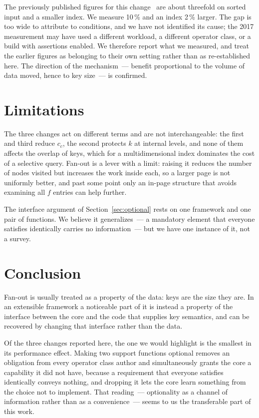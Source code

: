 The previously published figures for this change~\cite{borodin2017memory} are
about threefold on sorted input and a smaller index. We measure 10\,\% and an
index 2\,\% larger. The gap is too wide to attribute to conditions, and we have
not identified its cause; the 2017 measurement may have used a different
workload, a different operator class, or a build with assertions enabled. We
therefore report what we measured, and treat the earlier figures as belonging to
their own setting rather than as re-established here. The direction of the
mechanism~--- benefit proportional to the volume of data moved, hence to key
size~--- is confirmed.

\section{Limitations}

The three changes act on different terms and are not interchangeable: the first
and third reduce $c_c$, the second protects $k$ at internal levels, and none of
them affects the overlap of keys, which for a multidimensional index dominates
the cost of a selective query. Fan-out is a lever with a limit: raising it
reduces the number of nodes visited but increases the work inside each, so a
larger page is not uniformly better, and past some point only an in-page
structure that avoids examining all $f$ entries can help further.

The interface argument of Section~\ref{sec:optional} rests on one framework and
one pair of functions. We believe it generalizes~--- a mandatory element that
everyone satisfies identically carries no information~--- but we have one
instance of it, not a survey.

\section{Conclusion}

Fan-out is usually treated as a property of the data: keys are the size they are.
In an extensible framework a noticeable part of it is instead a property of the
interface between the core and the code that supplies key semantics, and can be
recovered by changing that interface rather than the data.

Of the three changes reported here, the one we would highlight is the smallest in
its performance effect. Making two support functions optional removes an
obligation from every operator class author and simultaneously grants the core a
capability it did not have, because a requirement that everyone satisfies
identically conveys nothing, and dropping it lets the core learn something from
the choice not to implement. That reading~--- optionality as a channel of
information rather than as a convenience~--- seems to us the transferable part of
this work.
